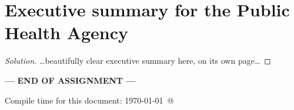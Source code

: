 \documentclass[12pt]{article}\usepackage[]{graphicx}\usepackage[]{color}
\begin{document}
\section{Executive summary for the Public Health Agency}

\ExecSumm

  {\color{blue} \begin{proof}[Solution]
  {\color{magenta}\dots beautifully clear executive summary here, on its own page\dots}
  \end{proof}
  }

\bigskip

\centerline{\bf--- END OF ASSIGNMENT ---}

\bigskip
Compile time for this document:
\today\ @ \thistime
\end{document}
